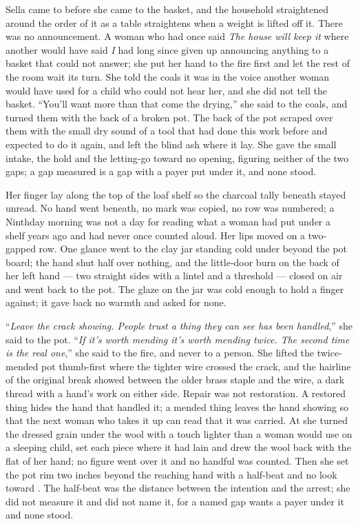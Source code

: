 Sella came to  before she came to the basket, and the household straightened around the order of it as a table straightens when a weight is lifted off it. There was no announcement. A woman who had once said \emph{The house will keep it} where another would have said \emph{I} had long since given up announcing anything to a basket that could not answer; she put her hand to the fire first and let the rest of the room wait its turn. She told the coals it was  in the voice another woman would have used for a child who could not hear her, and she did not tell the basket. “You'll want more than that come the drying,” she said to the coals, and turned them with the back of a broken pot. The back of the pot scraped over them with the small dry sound of a tool that had done this work before and expected to do it again, and left the blind ash where it lay. She gave the small intake, the hold and the letting-go toward no opening, figuring neither of the two gaps; a gap measured is a gap with a payer put under it, and none stood.

Her finger lay along the top of the loaf shelf so the charcoal tally beneath stayed unread. No hand went beneath, no mark was copied, no row was numbered; a Ninthday morning was not a day for reading what a woman had put under a shelf years ago and had never once counted aloud. Her lips moved on a two-gapped row. One glance went to the clay jar standing cold under  beyond the pot board; the hand shut half over nothing, and the little-door burn on the back of her left hand --- two straight sides with a lintel and a threshold --- closed on air and went back to the pot. The glaze on the jar was cold enough to hold a finger against; it gave back no warmth and asked for none.

“\emph{Leave the crack showing. People trust a thing they can see has been handled},” she said to the pot. “\emph{If it's worth mending it's worth mending twice. The second time is the real one},” she said to the fire, and never to a person. She lifted the twice-mended pot thumb-first where the tighter wire crossed the crack, and the hairline of the original break showed between the older brass staple and the wire, a dark thread with a hand's work on either side. Repair was not restoration. A restored thing hides the hand that handled it; a mended thing leaves the hand showing so that the next woman who takes it up can read that it was carried. At  she turned the dressed grain under the wool with a touch lighter than a woman would use on a sleeping child, set each piece where it had lain and drew the wool back with the flat of her hand; no figure went over it and no handful was counted. Then she set the pot rim two inches beyond the reaching hand with a half-beat and no look toward . The half-beat was the distance between the intention and the arrest; she did not measure it and did not name it, for a named gap wants a payer under it and none stood.

